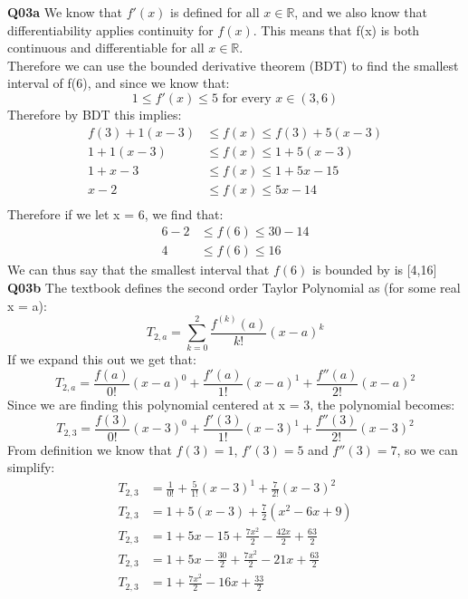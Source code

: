 \documentclass[11pt]{article}
\begin{document}
\parindent=0pt

\textbf{Q03a} We know that $f'(x)$ is defined for all $x \in \mathbb{R}$, and we also know that differentiability applies continuity for $f(x)$. This means that f(x) is both continuous and differentiable for all $x \in \mathbb{R}$.\\
Therefore we can use the bounded derivative theorem (BDT) to find the smallest interval of f(6), and since we know that:
\[ 1 \leq f'(x) \leq 5 \text{ for every } x \in (3,6) \]
Therefore by BDT this implies:
\begin{align*}
f(3) + 1(x-3)  & \leq f(x) \leq f(3) + 5(x-3) \\
1 + 1(x-3)  & \leq f(x) \leq 1+ 5(x-3) \\
1 + x-3  & \leq f(x) \leq 1+ 5x-15 \\
x - 2  & \leq f(x) \leq 5x-14 \\
\end{align*}
Therefore if we let x = 6, we find that:
\begin{align*}
6 - 2  & \leq f(6) \leq 30-14 \\
4  & \leq f(6) \leq 16 
\end{align*}
We can thus say that the smallest interval that $f(6)$ is bounded by is [4,16]\\


\textbf{Q03b} The textbook defines the second order Taylor Polynomial as (for some real x = a):
\[ T_{2,a}= \sum_{k=0}^{2}\frac{f^{(k)}(a)}{k!}(x-a)^k \]
If we expand this out we get that:
\[ T_{2,a}= \frac{f(a)}{0!}(x-a)^0 + \frac{f'(a)}{1!}(x-a)^1 + \frac{f''(a)}{2!}(x-a)^2  \]
Since we are finding this polynomial centered at x = 3, the polynomial becomes:
\[ T_{2,3}= \frac{f(3)}{0!}(x-3)^0 + \frac{f'(3)}{1!}(x-3)^1 + \frac{f''(3)}{2!}(x-3)^2  \]
From definition we know that $f(3) = 1$, $f'(3) = 5$ and $f''(3) = 7$, so we can simplify:
\begin{align*}
T_{2,3}& = \frac{1}{0!} + \frac{5}{1!}(x-3)^1 + \frac{7}{2!}(x-3)^2 \\
T_{2,3}& = 1 + 5(x-3) + \frac{7}{2}(x^2-6x+9) \\
T_{2,3}& = 1 + 5x - 15 + \frac{7x^2}{2} - \frac{42x}{2} +\frac{63}{2}  \\
T_{2,3}& = 1 + 5x - \frac{30}{2} + \frac{7x^2}{2} - 21x +\frac{63}{2}  \\
T_{2,3}& = 1 + \frac{7x^2}{2} - 16x +\frac{33}{2}  \\
\end{align*}
\end{document}

